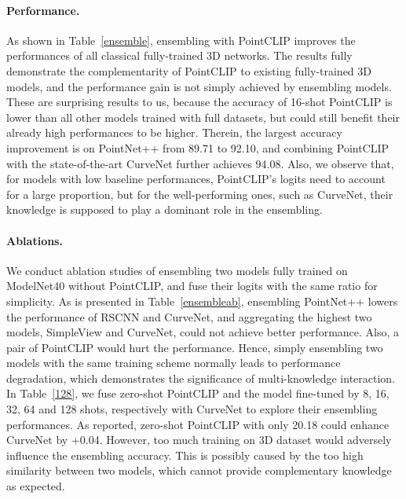 \documentclass[10pt,twocolumn,letterpaper]{article}
\begin{document}
\vspace*{-8pt}
\paragraph{Performance.} As shown in Table~\ref{ensemble}, ensembling with PointCLIP improves the performances of all classical fully-trained 3D networks. The results fully demonstrate the complementarity of PointCLIP to existing fully-trained 3D models, and the performance gain is not simply achieved by ensembling models. These are surprising results to us, because the accuracy of 16-shot PointCLIP is lower than all other models trained with full datasets, but could still benefit their already high performances to be higher. Therein, the largest accuracy improvement is on PointNet++ from 89.71 to 92.10, and combining PointCLIP with the state-of-the-art CurveNet further achieves 94.08. Also, we observe that, for models with low baseline performances, PointCLIP's logits need to account for a large proportion, but for the well-performing ones, such as CurveNet, their knowledge is supposed to play a dominant role in the ensembling. 

\vspace*{-8pt}
\paragraph{Ablations.} We conduct ablation studies of ensembling two models fully trained on ModelNet40 without PointCLIP, and fuse their logits with the same ratio for simplicity. As is presented in Table~\ref{ensembleab}, ensembling PointNet++ lowers the performance of RSCNN and CurveNet, and aggregating the highest two models, SimpleView and CurveNet, could not achieve better performance. Also, a pair of PointCLIP would hurt the performance. Hence, simply ensembling two models with the same training scheme normally leads to performance degradation, which demonstrates the significance of multi-knowledge interaction. In Table~\ref{128}, we fuse zero-shot PointCLIP and the model fine-tuned by 8, 16, 32, 64 and 128 shots, respectively with CurveNet to explore their ensembling performances. As reported, zero-shot PointCLIP with only 20.18 could enhance CurveNet by +0.04. However, too much training on 3D dataset would adversely influence the ensembling accuracy. This is possibly caused by the too high similarity between two models, which cannot provide complementary knowledge as expected.
\end{document}
